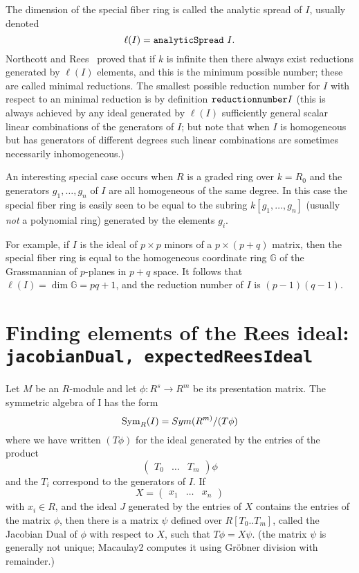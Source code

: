 \documentclass[twoside,12pt, leqno]{amsart}
\begin{document}
The dimension of the special fiber ring is called the analytic spread of $I$, usually
denoted
$$
\ell(I) = {\tt analyticSpread\ }I.
$$
Northcott and Rees~\cite{NR} proved that if $k$ is infinite then there always exist reductions
generated by $\ell(I)$ elements, and this is the minimum possible number; these are called
minimal reductions. The smallest possible reduction number for $I$ with respect to an minimal reduction is  by definition ${\tt reduction number} I$ (this is always achieved by any ideal generated by $\ell(I)$ sufficiently general scalar linear combinations of the generators of $I$; but note that when $I$ is homogeneous but has generators of different degrees such linear combinations are sometimes necessarily inhomogeneous.)

An interesting special case occurs when $R$ is a graded ring over $k = R_0$ and the generators $g_1,\dots, g_n$ of $I$ are all homogeneous of the same degree. In this case the special fiber ring is easily seen to be equal to the subring $k[g_1,\dots,g_n]$ (usually \emph{not} a polynomial ring) generated by the elements $g_i$.

\def\G{{\mathbb G}}
For example, if $I$ is the ideal of $p\times p$ minors of a $p\times (p+q)$ matrix, then
the special fiber ring is equal to the homogeneous coordinate ring $\G$ of the Grassmannian of
$p$-planes in $p+q$ space. It follows that $\ell(I) = \dim \G = pq+1$, and the reduction number of $I$ is
$(p-1)(q-1)$.

\section{Finding elements of the Rees ideal: {\tt jacobianDual, expectedReesIdeal}}

Let $M$ be an $R$-module and let $\phi: R^{s}\to R^{m}$ be its presentation matrix.
     The symmetric algebra of I has the form      
     $$
     \operatorname{Sym}_R(I) = Sym(R^{m)}/(T\phi)
     $$
     where we have written $(T\phi)$  for the ideal generated by the entries
     of the product 
 $$
\begin{pmatrix}
 T_{0}&\dots&T_{m}
\end{pmatrix}\phi
$$
and the $T_{i}$ correspond to the generators of $I$. If 
     $$
     X = \begin{pmatrix}
x_1&\dots&x_{n}
\end{pmatrix}
$$
     with $x_i \in R$, and the ideal $J$ generated by the entries of $X$ 
     contains the entries of the matrix $\phi$, then there is 
     a matrix $\psi$ defined over $R[T_0..T_m]$, called the Jacobian Dual of $\phi$ with respect to $X$,
     such that $T\phi = X\psi$. (the matrix $\psi$ is generally
     not unique; Macaulay2 computes it using Gr\"obner division with remainder.)
           
\end{document}
